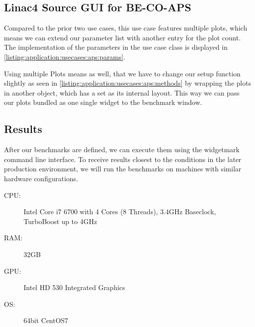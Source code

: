 

\subsection{Linac4 Source GUI for BE-CO-APS}

Compared to the prior two use cases, this use case features multiple plots,
which means we can extend our parameter list with another entry for the plot
count. The implementation of the parameters in the use case class is displayed
in \ref{listing:application:usecases:aps:params}.



Using multiple Plots means as well, that we have to change our setup function
slightly as seen in \ref{listing:application:usecases:aps:methods} by wrapping
the plots in another  object, which has a
 set as its internal layout. This way
we can pass our plots bundled as one single widget to the benchmark window.



\subsection{Results}

After our benchmarks are defined, we can execute them using the widgetmark
command line interface. To receive results closest to the conditions in the
later production environment, we will run the benchmarks on machines with
similar hardware configurations.

\begin{description}

    \item[CPU:] Intel Core i7 6700 with 4 Cores (8 Threads),
                3.4GHz Baseclock,
                TurboBoost up to 4GHz

    \item[RAM:] 32GB

    \item[GPU:] Intel HD 530 Integrated Graphics

    \item[OS:] 64bit CentOS7

\end{description}

